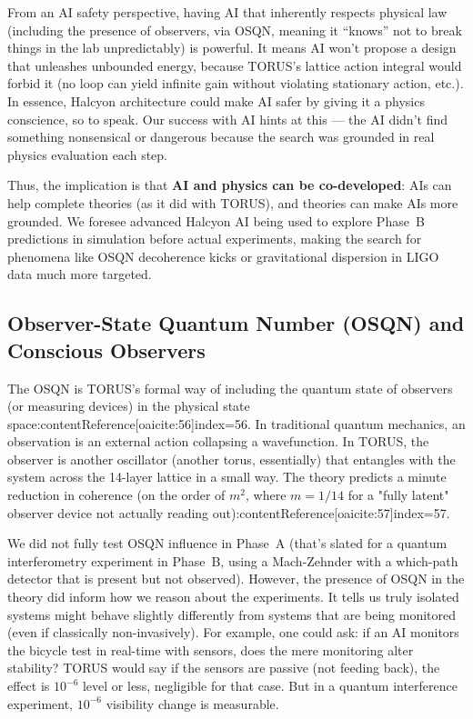 \documentclass[12pt]{article}
\begin{document}
From an AI safety perspective, having AI that inherently respects physical law (including the presence of observers, via OSQN, meaning it “knows” not to break things in the lab unpredictably) is powerful. It means AI won’t propose a design that unleashes unbounded energy, because TORUS’s lattice action integral would forbid it (no loop can yield infinite gain without violating stationary action, etc.). In essence, Halcyon architecture could make AI safer by giving it a physics conscience, so to speak. Our success with AI hints at this — the AI didn’t find something nonsensical or dangerous because the search was grounded in real physics evaluation each step.

Thus, the implication is that \textbf{AI and physics can be co-developed}: AIs can help complete theories (as it did with TORUS), and theories can make AIs more grounded. We foresee advanced Halcyon AI being used to explore Phase~B predictions in simulation before actual experiments, making the search for phenomena like OSQN decoherence kicks or gravitational dispersion in LIGO data much more targeted.

\subsection{Observer-State Quantum Number (OSQN) and Conscious Observers}
The OSQN is TORUS’s formal way of including the quantum state of observers (or measuring devices) in the physical state space:contentReference[oaicite:56]{index=56}. In traditional quantum mechanics, an observation is an external action collapsing a wavefunction. In TORUS, the observer is another oscillator (another torus, essentially) that entangles with the system across the 14-layer lattice in a small way. The theory predicts a minute reduction in coherence (on the order of $m^2$, where $m=1/14$ for a "fully latent" observer device not actually reading out):contentReference[oaicite:57]{index=57}. 

We did not fully test OSQN influence in Phase~A (that’s slated for a quantum interferometry experiment in Phase~B, using a Mach-Zehnder with a which-path detector that is present but not observed). However, the presence of OSQN in the theory did inform how we reason about the experiments. It tells us truly isolated systems might behave slightly differently from systems that are being monitored (even if classically non-invasively). For example, one could ask: if an AI monitors the bicycle test in real-time with sensors, does the mere monitoring alter stability? TORUS would say if the sensors are passive (not feeding back), the effect is $10^{-6}$ level or less, negligible for that case. But in a quantum interference experiment, $10^{-6}$ visibility change is measurable.
\end{document}
